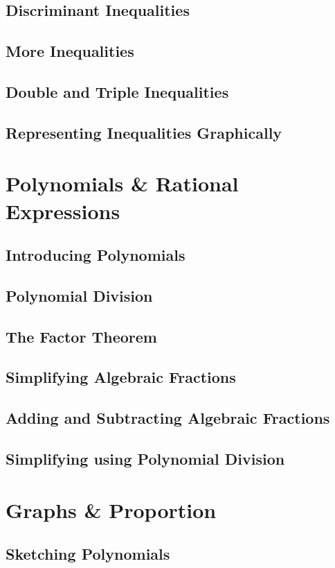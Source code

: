\documentclass[../maths.tex]{subfiles}
\begin{document}
\subsection*{Discriminant Inequalities}
\subsection*{More Inequalities}
\subsection*{Double and Triple Inequalities}
\subsection*{Representing Inequalities Graphically}
\section{Polynomials \& Rational Expressions}
\subsection*{Introducing Polynomials}
\subsection*{Polynomial Division}
\subsection*{The Factor Theorem}
\subsection*{Simplifying Algebraic Fractions}
\subsection*{Adding and Subtracting Algebraic Fractions}
\subsection*{Simplifying using Polynomial Division}
\section{Graphs \& Proportion}
\subsection*{Sketching Polynomials}
\end{document}
